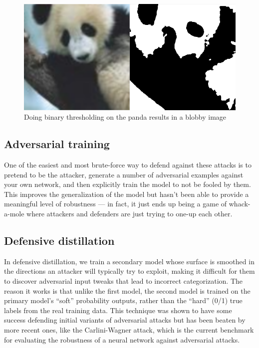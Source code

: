         \begin{figure}[htbp]
            \centering
            \includegraphics[width=0.7\linewidth]{images/panda_thresholding.png}
            \caption{Doing binary thresholding on the panda results in a blobby image}
            \label{fig:panda_thresholding}
        \end{figure}

    \subsection{Adversarial training}
        One of the easiest and most brute-force way to defend against these attacks is to pretend to be the attacker, generate a number of adversarial examples against your own network, and then explicitly train the model to not be fooled by them. This improves the generalization of the model but hasn’t been able to provide a meaningful level of robustness — in fact, it just ends up being a game of whack-a-mole where attackers and defenders are just trying to one-up each other.

    \subsection{Defensive distillation}
        In defensive distillation, we train a secondary model whose surface is smoothed in the directions an attacker will typically try to exploit, making it difficult for them to discover adversarial input tweaks that lead to incorrect categorization. The reason it works is that unlike the first model, the second model is trained on the primary model’s “soft” probability outputs, rather than the “hard” (0/1) true labels from the real training data. This technique was shown to have some success defending initial variants of adversarial attacks but has been beaten by more recent ones, like the Carlini-Wagner attack, which is the current benchmark for evaluating the robustness of a neural network against adversarial attacks.

